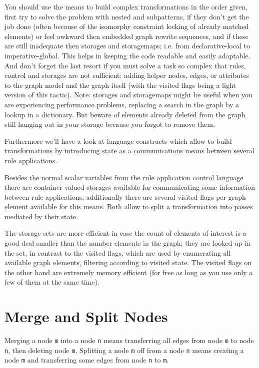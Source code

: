 \begin{note}
You should use the means to build complex transformations in the order given, first try to solve the problem with nested and subpatterns, if they don't get the job done (often because of the isomorphy constraint locking of already matched elements) or feel awkward then embedded graph rewrite sequences, and if these are still inadequate then storages and storagemaps; i.e. from declarative-local to imperative-global. This helps in keeping the code readable and easily adaptable. And don't forget the last resort if you must solve a task so complex that rules, control and storages are not sufficient: adding helper nodes, edges, or attributes to the graph model and the graph itself (with the visited flags being a light version of this tactic). Note: storages and storagemaps might be useful when you are experiencing performance problems, replacing a search in the graph by a lookup in a dictionary. But beware of elements already deleted from the graph still hanging out in your storage because you forgot to remove them.
\end{note}

Furthermore we'll have a look at language constructs which allow to build transformations by introducing state as a communications means between several rule applications.

Besides the normal scalar variables from the rule application control language there are container-valued storages available for communicating some information between rule applications;
additionally there are several visited flags per graph element available for this means.
Both allow to split a transformation into passes mediated by their state.

\begin{note}
The storage sets are more efficient in case the count of elements of interest is a good deal smaller than the number elements in the graph; they are looked up in the set, in contrast to the visited flags, which are used by enumerating all available graph elements, filtering according to visited state.
The visited flags on the other hand are extremely memory efficient (for free as long as you use only a few of them at the same time).
\end{note}


\section{Merge and Split Nodes}
Merging a node \texttt{m} into a node \texttt{n} means transferring all edges from node \texttt{m} to node \texttt{n}, then deleting node \texttt{m}.
Splitting a node \texttt{m} off from a node \texttt{n} means creating a node \texttt{m} and transferring some edges from node \texttt{n} to \texttt{m}.

